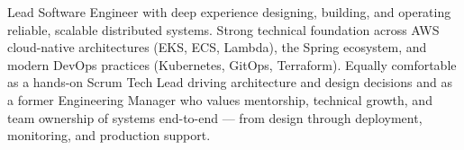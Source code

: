 

\begin{cvparagraph}
Lead Software Engineer with deep experience designing, building, and operating reliable, scalable
distributed systems. Strong technical foundation across AWS cloud-native architectures (EKS, ECS,
Lambda), the Spring ecosystem, and modern DevOps practices (Kubernetes, GitOps, Terraform).
Equally comfortable as a hands-on Scrum Tech Lead driving architecture and design
decisions and as a former Engineering Manager who values mentorship, technical growth, and team
ownership of systems end-to-end --- from design through deployment, monitoring, and production
support.
\end{cvparagraph}
